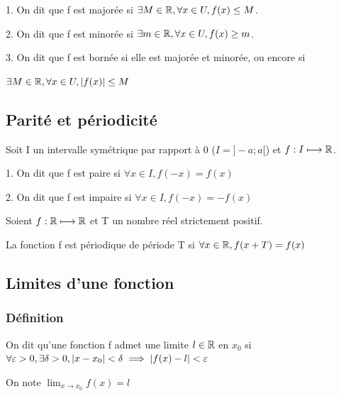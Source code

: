 \documentclass[a4paper, 12pt]{article}
\begin{document}
\begin{definition}
    \item 1. On dit que f est majorée si $\exists M \in \mathbb{R}, \forall x \in U, f(x) \leq M$.
    \item 2. On dit que f est minorée si $\exists m \in \mathbb{R}, \forall x \in U, f(x) \geq m$.
    \item 3. On dit que f est bornée si elle est majorée et minorée, ou encore si\par\noindent $\exists M \in \mathbb{R}, \forall x \in U, |f(x)| \leq M$
\end{definition}

\subsection{Parité et périodicité}

\begin{definition}
    Soit I un intervalle symétrique par rapport à 0 ($I = ]-a; a[$) et $f: I \longmapsto \mathbb{R}$.

    \item 1. On dit que f est paire si $\forall x \in I, f(-x) = f(x)$
    \item 2. On dit que f est impaire si $\forall x \in I, f(-x) = -f(x)$
\end{definition}

\begin{definition}
    Soient $f: \mathbb{R} \longmapsto \mathbb{R}$ et T un nombre réel strictement positif.

    La fonction f est périodique de période T si $\forall x \in \mathbb{R}, f(x + T) = f(x)$
\end{definition}



\subsection{Limites d'une fonction}

\subsubsection{Définition}

\begin{definition}
    On dit qu'une fonction f admet une limite $l \in \mathbb{R}$ en $x_0$ si $\forall \varepsilon > 0, \exists \delta > 0, |x - x_0| < \delta \implies |f(x) - l| < \varepsilon$

    On note $\lim_{x \to x_0} f(x) = l$
\end{definition}
\end{document}
